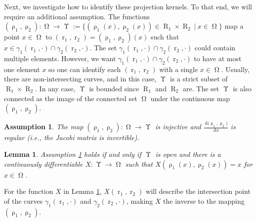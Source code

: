 \documentclass[12pt]{article}
\newtheorem{lemma}[theorem]{Lemma}
\newtheorem{assumption}[theorem]{Assumption}
\DeclareMathOperator{\Xgroundset}{\Upsilon}
\newcommand{\dd}[1]{\,\mathrm{d}{#1}}
\DeclareMathOperator{\rayvariable}{r}
\DeclareMathOperator{\raygroundset}{R}
\DeclareMathOperator{\rayinverse}{\rho}
\DeclareMathOperator{\imgdom}{{\Omega}}
\begin{document}
Next, we investigate how to identify these projection kernels. To that end, we will require an additional assumption.
The functions $(\rayinverse_1,\rayinverse_2)\colon \imgdom \to \Xgroundset := \{(\rayinverse_1(x),\rayinverse_2(x))\in \raygroundset_1\times \raygroundset_2 \ \big|\ x \in \imgdom\}$ map a point $x\in \imgdom$ to $(\rayvariable_1,\rayvariable_2)=(\rayinverse_1,\rayinverse_2)(x)$ such that $x\in \gamma_1(\rayvariable_1,\cdot)\cap \gamma_2(\rayvariable_2,\cdot)$. The set $\gamma_1(\rayvariable_1,\cdot)\cap \gamma_2(\rayvariable_2,\cdot)$ could contain multiple elements. However, we want $\gamma_1(\rayvariable_1,\cdot)\cap \gamma_2(\rayvariable_2,\cdot)$ to have at most one element $x$ so one can identify each $(\rayvariable_1,\rayvariable_2)$ with a single $x\in \imgdom$. Usually, there are non-intersecting curves, and in this case, $\Xgroundset$ is a strict subset of $\raygroundset_1\times \raygroundset_2$. In any case, $\Xgroundset$ is bounded since $\raygroundset_1$ and $\raygroundset_2$ are. The set $\Xgroundset$ is also connected as the image of the connected set $\imgdom$ under the continuous map $(\rayinverse_1,\rayinverse_2)$.


\begin{assumption}
\label{Assumption_curve_independent}
The map $(\rayinverse_1,\rayinverse_2)\colon \imgdom \to \Xgroundset$ is injective and $\frac{\dd (\rayinverse_1,\rayinverse_2)}{\dd x}$ is regular (i.e., the Jacobi matrix is invertible).
\end{assumption}

\begin{lemma} \label{lemma_X_exists}
Assumption \ref{Assumption_curve_independent} holds if and only if $\Xgroundset$ is open and
there is a continuously differentiable $X\colon \Xgroundset\to \imgdom$ such that $X(\rayinverse_1(x),\rayinverse_2(x))=x$ for $x\in \imgdom$. 
\end{lemma}

For the function $X$ in Lemma \ref{lemma_X_exists}, $X(\rayvariable_1,\rayvariable_2)$ will describe the intersection point of the curves $\gamma_1(\rayvariable_1,\cdot)$ and $\gamma_2(\rayvariable_2,\cdot)$, making $X$ the inverse to the mapping $(\rayinverse_1,\rayinverse_2)$.
\end{document}
